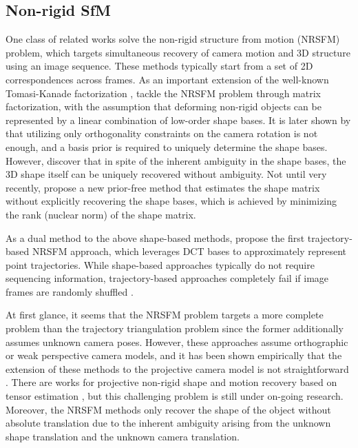 \subsection{Non-rigid SfM}
One class of related works solve the non-rigid structure from motion (NRSFM) problem, which targets simultaneous recovery of camera motion and 3D structure using an image sequence. These methods typically start from a set of 2D correspondences across frames. As an important extension of the well-known Tomasi-Kanade factorization \cite{tomasi1992shape}, \citet{Bregler_CVPR2000} tackle the NRSFM problem through matrix factorization, with the assumption that deforming non-rigid objects can be represented by a linear combination of low-order shape bases. It is later shown by \citet{Xiao_ECCV2004} that utilizing only orthogonality constraints on the camera rotation is not enough, and a basis prior is required to uniquely determine the shape bases. However, \citet{akhter2009defense} discover that in spite of the inherent ambiguity in the shape bases, the 3D shape itself can be uniquely recovered without ambiguity. Not until very recently, \cite{dai2014simple} propose a new prior-free method that estimates the shape matrix without explicitly recovering the shape bases, which is achieved by minimizing the rank (nuclear norm) of the shape matrix. 

As a dual method to the above shape-based methods, \citet{Akhter_NIPS08} propose the first trajectory-based NRSFM approach, which leverages DCT bases to approximately represent point trajectories. While shape-based approaches typically do not require sequencing information, trajectory-based approaches completely fail if image frames are randomly shuffled \cite{dai2014simple}.

At first glance, it seems that the NRSFM problem targets a more complete problem than the trajectory triangulation problem since the former additionally assumes unknown camera poses.
However, these approaches assume orthographic or weak perspective camera models, and it has been shown empirically that the extension of these methods to the projective camera model is not straightforward \cite{Park_ECCV2010}. There are works for projective non-rigid shape and motion recovery based on tensor estimation \cite{hartley2008perspective,vidal2006nonrigid}, but this challenging problem is still under on-going research. Moreover, the NRSFM methods only recover the shape of the object without absolute translation due to the inherent ambiguity arising from the unknown shape translation and the unknown camera translation. 

